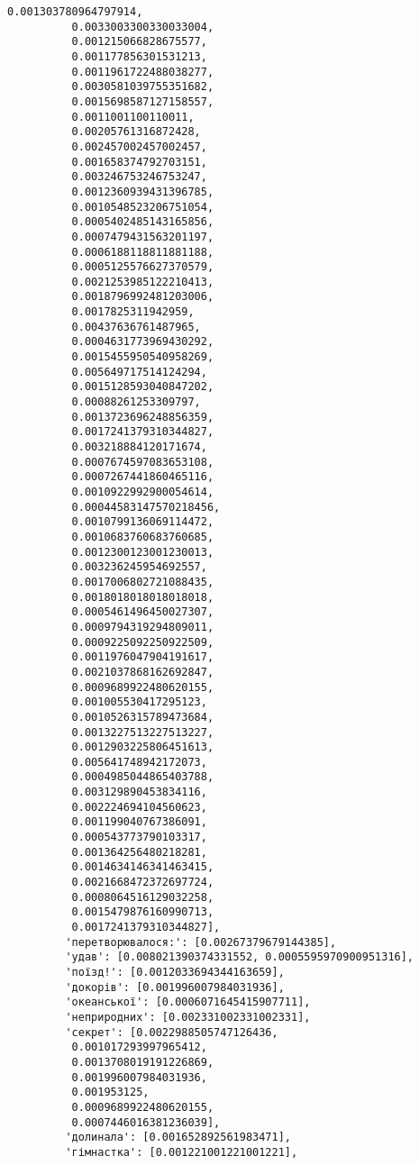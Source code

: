 \documentclass[11pt]{article}
\begin{document}
\begin{Verbatim}[commandchars=\\\{\}]
          0.001303780964797914,
          0.0033003300330033004,
          0.001215066828675577,
          0.001177856301531213,
          0.0011961722488038277,
          0.0030581039755351682,
          0.0015698587127158557,
          0.0011001100110011,
          0.00205761316872428,
          0.002457002457002457,
          0.001658374792703151,
          0.003246753246753247,
          0.0012360939431396785,
          0.0010548523206751054,
          0.0005402485143165856,
          0.0007479431563201197,
          0.0006188118811881188,
          0.0005125576627370579,
          0.0021253985122210413,
          0.0018796992481203006,
          0.0017825311942959,
          0.00437636761487965,
          0.0004631773969430292,
          0.0015455950540958269,
          0.005649717514124294,
          0.0015128593040847202,
          0.00088261253309797,
          0.0013723696248856359,
          0.0017241379310344827,
          0.003218884120171674,
          0.0007674597083653108,
          0.0007267441860465116,
          0.0010922992900054614,
          0.00044583147570218456,
          0.0010799136069114472,
          0.0010683760683760685,
          0.0012300123001230013,
          0.003236245954692557,
          0.0017006802721088435,
          0.0018018018018018018,
          0.0005461496450027307,
          0.0009794319294809011,
          0.0009225092250922509,
          0.0011976047904191617,
          0.0021037868162692847,
          0.0009689922480620155,
          0.001005530417295123,
          0.0010526315789473684,
          0.0013227513227513227,
          0.0012903225806451613,
          0.005641748942172073,
          0.0004985044865403788,
          0.003129890453834116,
          0.002224694104560623,
          0.001199040767386091,
          0.000543773790103317,
          0.001364256480218281,
          0.0014634146341463415,
          0.0021668472372697724,
          0.0008064516129032258,
          0.0015479876160990713,
          0.0017241379310344827],
         'перетворювалося:': [0.00267379679144385],
         'удав': [0.008021390374331552, 0.0005595970900951316],
         'поїзд!': [0.0012033694344163659],
         'докорів': [0.001996007984031936],
         'океанської': [0.0006071645415907711],
         'неприродних': [0.002331002331002331],
         'секрет': [0.0022988505747126436,
          0.001017293997965412,
          0.0013708019191226869,
          0.001996007984031936,
          0.001953125,
          0.0009689922480620155,
          0.0007446016381236039],
         'долинала': [0.001652892561983471],
         'гімнастка': [0.001221001221001221],

\end{Verbatim}
\end{document}
